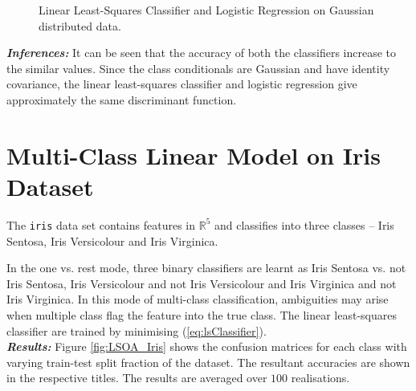 \documentclass[12pt, a4 paper]{article}
\newcommand{\rr}{\mathbb{R}}
\begin{document}
\begin{figure}
\caption{Linear Least-Squares Classifier and Logistic Regression on Gaussian distributed data.}
\label{fig:LS_LOG_Gaussian}
\end{figure}

{\it \bfseries Inferences:} It can be seen that the accuracy of both the classifiers increase to the similar values. Since the class conditionals are Gaussian and have identity covariance, the linear least-squares classifier and logistic regression give approximately the same discriminant function. \\


\section{Multi-Class Linear Model on Iris Dataset}
\label{sec:bayes20D}

The \texttt{iris} data set contains features in $\rr^{5}$ and classifies into three classes -- Iris Sentosa, Iris Versicolour and Iris Virginica.

\label{prob:2.i}

In the one vs. rest mode, three binary classifiers are learnt as Iris Sentosa vs. not Iris Sentosa, Iris Versicolour and not Iris Versicolour and Iris Virginica and not Iris Virginica. In this mode of multi-class classification, ambiguities may arise when multiple class flag the feature into the true class. The linear least-squares classifier are trained by minimising (\ref{eq:lsClassifier}). \\

{\it \bfseries Results:} Figure \ref{fig:LSOA_Iris} shows the confusion matrices for each class with varying train-test split fraction of the dataset. The resultant accuracies are shown in the respective titles. The results are averaged over $100$ realisations. \\
\end{document}
